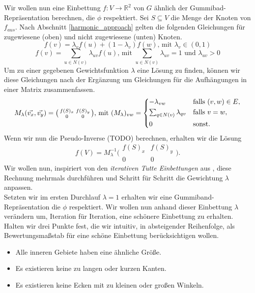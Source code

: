 Wir wollen nun eine Einbettung $f:V\to \mathbb{R}^2$ von $G$ ähnlich der Gummibad-Repräsentation berechnen, die $\phi$ respektiert. Sei $S \subseteq V$ die Menge der Knoten von $f_{aus}$. Nach Abschnitt \ref{harmonic_approach} gelten die folgenden Gleichungen für zugewiesene (oben) und nicht zugewiesene (unten) Knoten.
$$ f(v) = \lambda_v f(u) + (1-\lambda_v)f(w) \text{, mit } \lambda_v \in (0,1) $$
$$ f(v) = \sum_{u \in N(v)} \lambda_{uv} f(u) \text{, mit }  \sum_{u \in N(v)}\lambda_{uv} = 1 \text{ und } \lambda_{uv} > 0 $$
Um zu einer gegebenen Gewichtsfunktion $\lambda$ eine Lösung zu finden, können wir diese Gleichungen nach der Ergänzung um Gleichungen für die Aufhängungen in einer Matrix zusammenfassen.
\[ M_{\lambda}(\vec{v_x},\vec{v_y}) = \big( \begin{smallmatrix}f(S)_x&f(S)_y\\ 0&0\end{smallmatrix} \big) \text{, mit } (M_{\lambda})_{vw} =
	\begin{dcases}
	-\lambda_{vw} & \text{falls } (v,w) \in E, \\
	\textstyle\sum_{q \in N(v)} \lambda_{qv} & \text{falls } v = w, \\
	0 & \text{sonst.} \\
	\end{dcases}
\]
Wenn wir nun die Pseudo-Inverse (TODO) berechnen, erhalten wir die Lösung
$$f(V) = M_{\lambda}^{-1}\big( \begin{smallmatrix}f(S)_x&f(S)_y\\ 0&0\end{smallmatrix} \big).$$
Wir wollen nun, inspiriert von den \textit{iterativen Tutte Einbettungen} aus \cite{fs17}, diese Rechnung mehrmals durchführen und Schritt für Schritt die Gewichtung $\lambda$ anpassen.\\

Setzten wir im ersten Durchlauf $\lambda = 1$ erhalten wir eine Gummiband-Repräsentation die $\phi$ respektiert. Wir wollen nun anhand dieser Einbettung $\lambda$ verändern um, Iteration für Iteration, eine \glqq schönere\grqq{ } Einbettung zu erhalten. Halten wir drei Punkte fest, die wir intuitiv, in absteigender Reihenfolge, als Bewertungsmaßstab für eine schöne Einbettung berücksichtigen wollen.
\begin{itemize}
\item Alle inneren Gebiete haben eine ähnliche Größe.
\item Es existieren keine zu langen oder kurzen Kanten.
\item Es existieren keine Ecken mit zu kleinen oder großen Winkeln.
\end{itemize}

